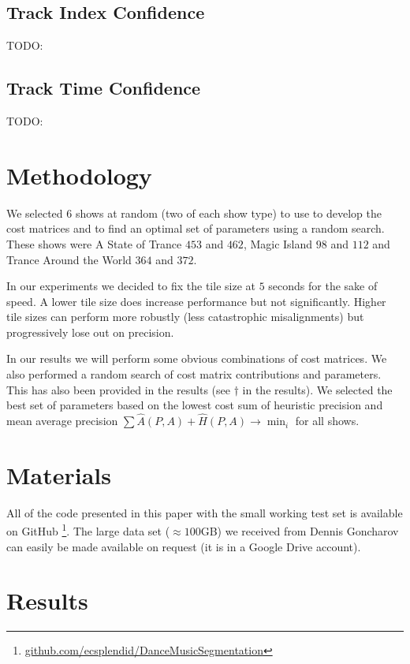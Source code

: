 \documentclass[twocolumn]{article}
\begin{document}
\subsection{Track Index Confidence}
TODO:
\subsection{Track Time Confidence}

TODO:

\section{Methodology}\label{sec:methodology}

We selected $6$ shows at random (two of each show type) to use to develop the cost matrices and to find an optimal set of parameters using a random search. These shows were A State of Trance $453$ and $462$, Magic Island $98$ and $112$ and Trance Around the World $364$ and $372$.  

In our experiments we decided to fix the tile size at $5$ seconds for the sake of speed. A lower tile size does increase performance but not significantly. Higher tile sizes can perform more robustly (less catastrophic misalignments) but progressively lose out on precision.

In our results we will perform some obvious combinations of cost matrices. We also performed a random search of cost matrix contributions and parameters. This has also been provided in the results (see $\dagger$ in the results). We selected the best set of parameters based on the lowest cost sum of heuristic precision and mean average precision $\sum \hat A(P,A) + \hat H(P,A) \rightarrow \min_i$ for all shows. 

\section{Materials}\label{sec:materials}

All of the code presented in this paper with the small working test set is available on GitHub \footnote{\url{github.com/ecsplendid/DanceMusicSegmentation}}. The large data set ($\approx100$GB) we received from Dennis Goncharov can easily be made available on request (it is in a Google Drive account).

\section{Results}\label{sec:results}
\end{document}
